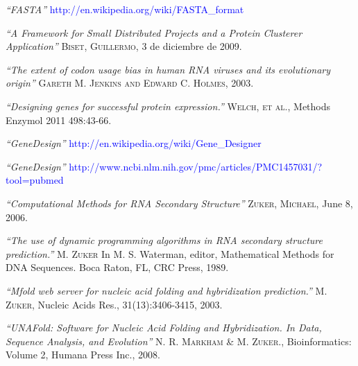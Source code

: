 \documentclass[12pt,a4paper,spanish]{article}
\begin{document}
\begin{thebibliography}{99}
\small	{} {\em{“FASTA”}} \textcolor{blue}{http://en.wikipedia.org/wiki/FASTA\_format}

\small	{} {\em{“A Framework for Small Distributed Projects and a Protein Clusterer Application”}}
			\textsc{Biset, Guillermo}, 3 de diciembre de 2009.

\small {} {\em{“The extent of codon usage bias in human RNA viruses and its evolutionary origin”}}
			\textsc{Gareth M. Jenkins and Edward C. Holmes}, 2003.
 
\small {} {\em{“Designing genes for successful protein expression.”}}
			\textsc{Welch, et al.}, Methods Enzymol 2011 498:43-66. 

\small {} {\em{“GeneDesign”}} \textcolor{blue}{http://en.wikipedia.org/wiki/Gene\_Designer}

\small {} {\em{“GeneDesign”}} \textcolor{blue}{http://www.ncbi.nlm.nih.gov/pmc/articles/PMC1457031/?tool=pubmed}

\small {} {\em{“Computational Methods for RNA Secondary Structure”}} 
			\textsc{Zuker, Michael}, June 8, 2006.

\small {} {\em{“The use of dynamic programming algorithms in RNA secondary structure prediction.”}}
		\textsc{M. Zuker} In M. S. Waterman, editor, Mathematical Methods for DNA Sequences. Boca Raton, FL, CRC Press, 		1989.

\small {} {\em{“Mfold web server for nucleic acid folding and hybridization prediction.”}}
		\textsc{M. Zuker}, Nucleic Acids Res., 31(13):3406-3415, 2003.

\small {} {\em{“UNAFold: Software for Nucleic Acid Folding and Hybridization. In Data, Sequence Analysis, and 			Evolution”}}
		\textsc{N. R. Markham \& M. Zuker.}, Bioinformatics: Volume 2, Humana Press Inc., 2008.

\end{thebibliography}
\end{document}
